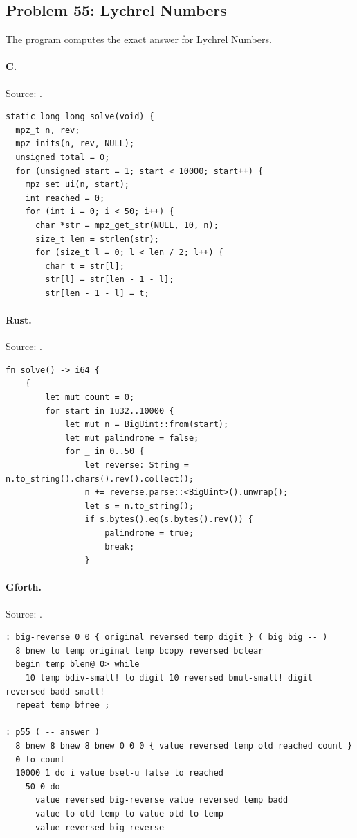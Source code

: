\subsection{Problem 55: Lychrel Numbers}
\label{walkthrough:p55}
The program computes the exact answer for Lychrel Numbers.

\paragraph{C.} Source: .
\begin{lstlisting}
static long long solve(void) {
  mpz_t n, rev;
  mpz_inits(n, rev, NULL);
  unsigned total = 0;
  for (unsigned start = 1; start < 10000; start++) {
    mpz_set_ui(n, start);
    int reached = 0;
    for (int i = 0; i < 50; i++) {
      char *str = mpz_get_str(NULL, 10, n);
      size_t len = strlen(str);
      for (size_t l = 0; l < len / 2; l++) {
        char t = str[l];
        str[l] = str[len - 1 - l];
        str[len - 1 - l] = t;
\end{lstlisting}

\paragraph{Rust.} Source: .
\begin{lstlisting}
fn solve() -> i64 {
    {
        let mut count = 0;
        for start in 1u32..10000 {
            let mut n = BigUint::from(start);
            let mut palindrome = false;
            for _ in 0..50 {
                let reverse: String = n.to_string().chars().rev().collect();
                n += reverse.parse::<BigUint>().unwrap();
                let s = n.to_string();
                if s.bytes().eq(s.bytes().rev()) {
                    palindrome = true;
                    break;
                }
\end{lstlisting}

\paragraph{Gforth.} Source: .
\begin{lstlisting}
: big-reverse 0 0 { original reversed temp digit } ( big big -- )
  8 bnew to temp original temp bcopy reversed bclear
  begin temp blen@ 0> while
    10 temp bdiv-small! to digit 10 reversed bmul-small! digit reversed badd-small!
  repeat temp bfree ;

: p55 ( -- answer )
  8 bnew 8 bnew 8 bnew 0 0 0 { value reversed temp old reached count }
  0 to count
  10000 1 do i value bset-u false to reached
    50 0 do
      value reversed big-reverse value reversed temp badd
      value to old temp to value old to temp
      value reversed big-reverse
\end{lstlisting}

